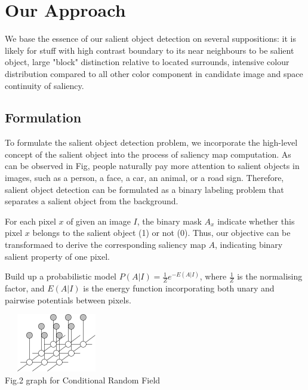 \documentclass[10pt,twocolumn,letterpaper]{article}
\begin{document}
\section{Our Approach}

We base the essence of our salient object detection on several suppositions: 
it is likely for stuff with high contrast boundary to its near neighbours to be salient object, 
large "block" distinction relative to located surrounds, 
intensive colour distribution compared to all other color component
in candidate image and space continuity of saliency. \\

\subsection{Formulation}
    To formulate the salient object detection problem, we incorporate the high-level concept
    of the salient object into the process of saliency map computation.
    As can be observed in Fig, people naturally pay more attention to salient objects in images, such as a person,
    a face, a car, an animal, or a road sign. Therefore, salient object detection can be formulated as a binary
    labeling problem that separates a salient object from the background. 

    For each pixel $x$ of given an image $I$, the binary mask $A_x$ indicate whether this pixel
    $x$ belongs to the salient object (1) or not (0). Thus, our objective can be transformaed to 
    derive the corresponding saliency map $A$, indicating binary salient property of one pixel.

    Build up a probabilistic model $P(A|I)=\frac{1}{Z}e^{-E(A|I)}$, where $\frac{1}{Z}$ is the normalising factor, and $E(A|I)$ is the energy function incorporating both unary and pairwise potentials between pixels.
    \begin{center}
        \includegraphics[width=1.8in,height=1in]{./Figures/mrf.jpg} \\
        \footnotesize Fig.2 graph for Conditional Random Field
        \end{center}
\end{document}
